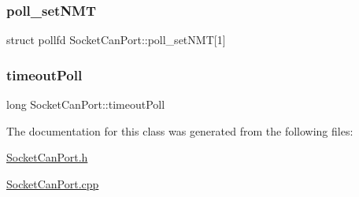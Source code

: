 \mbox{\label{classSocketCanPort_afaaf9cd49684de93be7370988ec64b47}} 
\subsubsection{\texorpdfstring{poll\+\_\+set\+N\+MT}{poll\_setNMT}}
{\footnotesize\ttfamily struct pollfd Socket\+Can\+Port\+::poll\+\_\+set\+N\+MT\mbox{[}1\mbox{]}\hspace{0.3cm}{\ttfamily [private]}}

\mbox{\label{classSocketCanPort_a18e670bf7f98482e022da2fd11264309}} 
\subsubsection{\texorpdfstring{timeout\+Poll}{timeoutPoll}}
{\footnotesize\ttfamily long Socket\+Can\+Port\+::timeout\+Poll\hspace{0.3cm}{\ttfamily [private]}}



The documentation for this class was generated from the following files\+:\begin{DoxyCompactItemize}
\item 
\hyperlink{SocketCanPort_8h}{Socket\+Can\+Port.\+h}\item 
\hyperlink{SocketCanPort_8cpp}{Socket\+Can\+Port.\+cpp}\end{DoxyCompactItemize}
